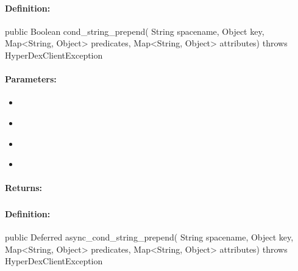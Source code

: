 \paragraph{Definition:}
\begin{javacode}
public Boolean cond_string_prepend(
        String spacename,
        Object key,
        Map<String, Object> predicates,
        Map<String, Object> attributes) throws HyperDexClientException
\end{javacode}

\paragraph{Parameters:}
\begin{itemize}[noitemsep]
\item {}\\

\item {}\\

\item {}\\

\item {}\\

\end{itemize}

\paragraph{Returns:}


\pagebreak
\subsubsection{}
\label{api:java:async_cond_string_prepend}


\paragraph{Definition:}
\begin{javacode}
public Deferred async_cond_string_prepend(
        String spacename,
        Object key,
        Map<String, Object> predicates,
        Map<String, Object> attributes) throws HyperDexClientException
\end{javacode}

